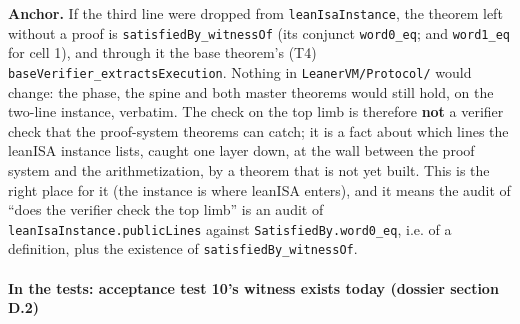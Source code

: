 \textbf{Anchor.} If the third line were dropped from \texttt{leanIsaInstance}, the theorem left without a proof is \texttt{satisfiedBy\_\allowbreak{}witnessOf} (its conjunct \texttt{word0\_\allowbreak{}eq}; and \texttt{word1\_\allowbreak{}eq} for cell 1), and through it the base theorem's (T4) \texttt{b\allowbreak{}a\allowbreak{}s\allowbreak{}e\allowbreak{}V\allowbreak{}e\allowbreak{}r\allowbreak{}i\allowbreak{}f\allowbreak{}i\allowbreak{}e\allowbreak{}r\allowbreak{}\_\allowbreak{}e\allowbreak{}x\allowbreak{}t\allowbreak{}r\allowbreak{}a\allowbreak{}c\allowbreak{}t\allowbreak{}s\allowbreak{}E\allowbreak{}x\allowbreak{}e\allowbreak{}c\allowbreak{}u\allowbreak{}t\allowbreak{}i\allowbreak{}o\allowbreak{}n}. Nothing in \texttt{LeanerVM/\allowbreak{}Protocol/} would change: the phase, the spine and both master theorems would still hold, on the two-line instance, verbatim. The check on the top limb is therefore \textbf{not} a verifier check that the proof-system theorems can catch; it is a fact about which lines the leanISA instance lists, caught one layer down, at the wall between the proof system and the arithmetization, by a theorem that is not yet built. This is the right place for it (the instance is where leanISA enters), and it means the audit of \enquote{does the verifier check the top limb} is an audit of \texttt{leanIsaInstance.\allowbreak{}publicLines} against \texttt{SatisfiedBy.\allowbreak{}word0\_\allowbreak{}eq}, i.e. of a definition, plus the existence of \texttt{satisfiedBy\_\allowbreak{}witnessOf}.

\paragraph{In the tests: acceptance test 10's witness exists today (dossier section D.2)}\label{sec:gen-pubinput-D2}


